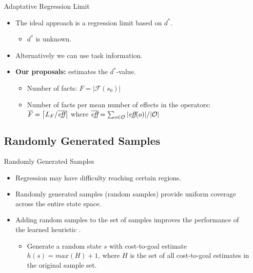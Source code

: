 \documentclass{gkibeamer}
\providecommand{\facts}{\ensuremath{F}\xspace}
\providecommand{\meanfx}{\ensuremath{\overline{F}}\xspace}
\providecommand{\distfarthest}{\ensuremath{d^*}\xspace}
\begin{document}
\begin{frame}{Adaptative Regression Limit}
\begin{itemize}
    \item The ideal approach is a regression limit based on \distfarthest.
    \pause
    \begin{itemize}
        \item \distfarthest is unknown.
    \end{itemize}
    \pause
    \item Alternatively we can use task information.
    \bigskip \pause
    \item \textbf{Our proposals:} estimates the \distfarthest-value.
    \begin{itemize}
        \pause
        \item Number of facts: $\facts=|\mathcal{F}(s_0)|$
        \pause
        \item Number of facts per mean number of effects in the operators: $\meanfx=\ceil{L_F/\overline{\eff}}$ where $\overline{\textit{eff}}=\sum_{o\in \mathcal{O}} |\textit{eff}(o)|/|\mathcal{O}|$
    \end{itemize}
\end{itemize}
\end{frame}

\subsection{Randomly Generated Samples}

\begin{frame}{Randomly Generated Samples}
\begin{itemize}
    \item Regression may have difficulty reaching certain regions.
    \pause
    \item Randomly generated samples (\alert{random samples}) provide uniform coverage across the entire state space.
    \pause
    \item Adding random samples to the set of samples improves the performance of the learned heuristic \parencite{OToole/2022}.
    \begin{itemize}
        \item Generate a random state $s$ with cost-to-goal estimate $h(s) = max(H)+1$, where $H$ is the set of all cost-to-goal estimates in the original sample set.
    \end{itemize}
\end{itemize}
\end{frame}
\end{document}
